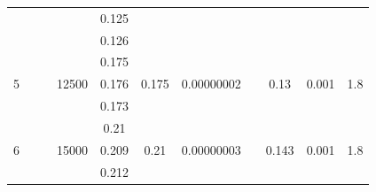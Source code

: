 \documentclass[a4paper,12pt]{article}
\begin{document}
\begin{justify}
\begin{table}[!h]
\begin{adjustwidth}{-1.25cm}{}
\begin{tabular}{|c|c|c|c|c|c|c|c|c|c|c|}
                   &                        &                                                          &                        & 0.125  &                        &                             &                                 &                        &                        &                        \\ \cline{5-5}
                   &                        &                                                          &                        & 0.126  &                        &                             &                                 &                        &                        &                        \\ \cline{1-1} \cline{4-7} \cline{9-11} 
\multirow{3}{*}{5} &                        &                                                          & \multirow{3}{*}{12500} & 0.175  & \multirow{3}{*}{0.175} & \multirow{3}{*}{0.00000002} &                                 & \multirow{3}{*}{0.13}  & \multirow{3}{*}{0.001} & \multirow{3}{*}{1.8}   \\ \cline{5-5}
                   &                        &                                                          &                        & 0.176  &                        &                             &                                 &                        &                        &                        \\ \cline{5-5}
                   &                        &                                                          &                        & 0.173  &                        &                             &                                 &                        &                        &                        \\ \cline{1-1} \cline{4-7} \cline{9-11} 
\multirow{3}{*}{6} &                        &                                                          & \multirow{3}{*}{15000} & 0.21   & \multirow{3}{*}{0.21}  & \multirow{3}{*}{0.00000003} &                                 & \multirow{3}{*}{0.143} & \multirow{3}{*}{0.001} & \multirow{3}{*}{1.8}   \\ \cline{5-5}
                   &                        &                                                          &                        & 0.209  &                        &                             &                                 &                        &                        &                        \\ \cline{5-5}
                   &                        &                                                          &                        & 0.212  &                        &                             &                                 &                        &                        &                        \\ \hline
\end{tabular}
\end{adjustwidth}
\end{table}\newpage

\end{justify}
\end{document}
